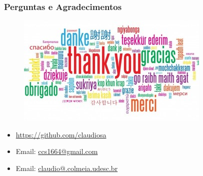 \documentclass{beamer}
\begin{document}
\begin{frame} [fragile]
\frametitle{Perguntas e Agradecimentos}
  
  \begin{center}
   \begin{figure} [!ht]
   \includegraphics[scale=0.56,keepaspectratio]{figures/thank-you-cloud.jpg} 
   \end{figure}
  \end{center} 

\vspace{-1cm}

\begin{block}{}
  \begin{itemize}
  
  \item \url{https://github.com/claudiosa}
  
  \item Email: \url{ccs1664@gmail.com}
  
  \item Email: \url{claudio@.colmeia.udesc.br}



  \end{itemize}
  \end{block}

\end{frame}
\end{document}
